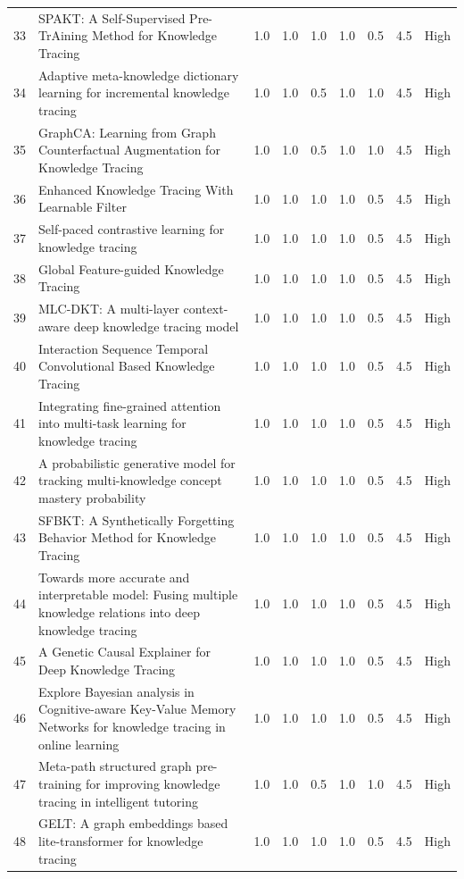 \documentclass{article}
\begin{document}
\begin{longtable}{p{1cm}p{8cm}p{1cm}p{1cm}p{1cm}p{1cm}p{1cm}p{1.5cm}p{1.5cm}}
33 & SPAKT: A Self-Supervised Pre-TrAining Method for Knowledge Tracing & 1.0 & 1.0 & 1.0 & 1.0 & 0.5 & 4.5 & High \\
34 & Adaptive meta-knowledge dictionary learning for incremental knowledge tracing & 1.0 & 1.0 & 0.5 & 1.0 & 1.0 & 4.5 & High \\
35 & GraphCA: Learning from Graph Counterfactual Augmentation for Knowledge Tracing & 1.0 & 1.0 & 0.5 & 1.0 & 1.0 & 4.5 & High \\
36 & Enhanced Knowledge Tracing With Learnable Filter & 1.0 & 1.0 & 1.0 & 1.0 & 0.5 & 4.5 & High \\
37 & Self-paced contrastive learning for knowledge tracing & 1.0 & 1.0 & 1.0 & 1.0 & 0.5 & 4.5 & High \\
38 & Global Feature-guided Knowledge Tracing & 1.0 & 1.0 & 1.0 & 1.0 & 0.5 & 4.5 & High \\
39 & MLC-DKT: A multi-layer context-aware deep knowledge tracing model & 1.0 & 1.0 & 1.0 & 1.0 & 0.5 & 4.5 & High \\
40 & Interaction Sequence Temporal Convolutional Based Knowledge Tracing & 1.0 & 1.0 & 1.0 & 1.0 & 0.5 & 4.5 & High \\
41 & Integrating fine-grained attention into multi-task learning for knowledge tracing & 1.0 & 1.0 & 1.0 & 1.0 & 0.5 & 4.5 & High \\
42 & A probabilistic generative model for tracking multi-knowledge concept mastery probability & 1.0 & 1.0 & 1.0 & 1.0 & 0.5 & 4.5 & High \\
43 & SFBKT: A Synthetically Forgetting Behavior Method for Knowledge Tracing & 1.0 & 1.0 & 1.0 & 1.0 & 0.5 & 4.5 & High \\
44 & Towards more accurate and interpretable model: Fusing multiple knowledge relations into deep knowledge tracing & 1.0 & 1.0 & 1.0 & 1.0 & 0.5 & 4.5 & High \\
45 & A Genetic Causal Explainer for Deep Knowledge Tracing & 1.0 & 1.0 & 1.0 & 1.0 & 0.5 & 4.5 & High \\
46 & Explore Bayesian analysis in Cognitive-aware Key-Value Memory Networks for knowledge tracing in online learning & 1.0 & 1.0 & 1.0 & 1.0 & 0.5 & 4.5 & High \\
47 & Meta-path structured graph pre-training for improving knowledge tracing in intelligent tutoring & 1.0 & 1.0 & 0.5 & 1.0 & 1.0 & 4.5 & High \\
48 & GELT: A graph embeddings based lite-transformer for knowledge tracing & 1.0 & 1.0 & 1.0 & 1.0 & 0.5 & 4.5 & High \\

\end{longtable}
\end{document}
